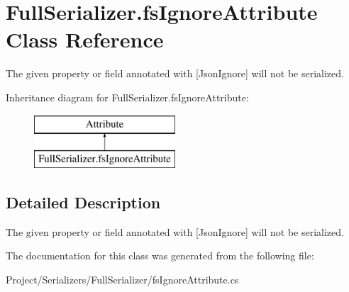 \hypertarget{class_full_serializer_1_1fs_ignore_attribute}{}\section{Full\+Serializer.\+fs\+Ignore\+Attribute Class Reference}
\label{class_full_serializer_1_1fs_ignore_attribute}


The given property or field annotated with \mbox{[}Json\+Ignore\mbox{]} will not be serialized.  


Inheritance diagram for Full\+Serializer.\+fs\+Ignore\+Attribute\+:\begin{figure}[H]
\begin{center}
\leavevmode
\includegraphics[height=2.000000cm]{class_full_serializer_1_1fs_ignore_attribute}
\end{center}
\end{figure}


\subsection{Detailed Description}
The given property or field annotated with \mbox{[}Json\+Ignore\mbox{]} will not be serialized. 



The documentation for this class was generated from the following file\+:\begin{DoxyCompactItemize}
\item 
Project/\+Serializers/\+Full\+Serializer/fs\+Ignore\+Attribute.\+cs\end{DoxyCompactItemize}
